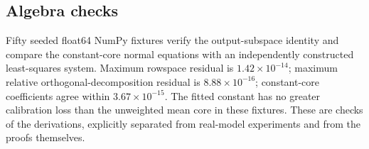 \begin{table}[t]
\centering\small
\caption{Pre-registered second-architecture audit on CPU synthetic fixtures
($d_{\rm model}{=}64$, 4 heads, head dim 16, $r{=}4$ per head, three seeds).
All trainable arms share one optimizer schedule; the compensated persistent
arm spends the conditioned arm's parameter budget on rank. The audit script
recomputes these rows from the archived report.}
\label{tab:secondarch}

\end{table}

\subsection{Algebra checks}
Fifty seeded float64 NumPy fixtures verify the output-subspace identity and
compare the constant-core normal equations with an independently constructed
least-squares system. Maximum rowspace residual is $1.42\times10^{-14}$;
maximum relative orthogonal-decomposition residual is $8.88\times10^{-16}$;
constant-core coefficients agree within $3.67\times10^{-15}$. The fitted
constant has no greater calibration loss than the unweighted mean core in
these fixtures. These are checks of the derivations, explicitly separated
from real-model experiments and from the proofs themselves.

